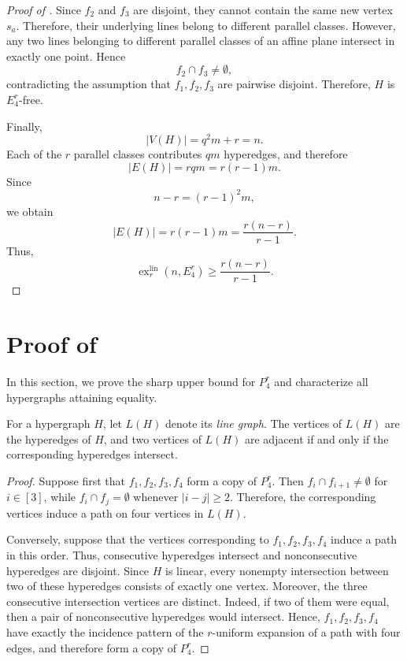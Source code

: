\documentclass[11pt,a4paper]{article}
\newtheorem{lemma}[theorem]{Lemma}
\theoremstyle{definition}
\theoremstyle{remark}
\begin{document}
\begin{proof}[Proof of ]
Since \(f_2\) and \(f_3\) are disjoint, they cannot contain the same
new vertex \(s_a\). Therefore, their underlying lines belong to
different parallel classes. However, any two lines belonging to
different parallel classes of an affine plane intersect in exactly
one point. Hence
$$
f_2\cap f_3\neq\emptyset,
$$
contradicting the assumption that \(f_1,f_2,f_3\) are pairwise
disjoint. Therefore, \(H\) is \(E_4^r\)-free.

Finally,
$$
|V(H)|
=
q^2m+r
=
n.
$$
Each of the \(r\) parallel classes contributes \(qm\) hyperedges, and
therefore
$$
|E(H)|
=
rqm
=
r(r-1)m.
$$
Since
$$
n-r=(r-1)^2m,
$$
we obtain
$$
|E(H)|
=
r(r-1)m
=
\frac{r(n-r)}{r-1}.
$$
Thus,
$$
\operatorname{ex}^{\mathrm{lin}}_r(n,E_4^r)
\geq
\frac{r(n-r)}{r-1}.
$$
\end{proof}

\section{Proof of }


In this section, we prove the sharp upper bound for $P_4^r$ and characterize all
hypergraphs attaining equality.


For a hypergraph $H$, let $L(H)$ denote its \emph{line graph}. The
vertices of $L(H)$ are the hyperedges of $H$, and two vertices of $L(H)$
are adjacent if and only if the corresponding hyperedges intersect.


\begin{proof}
Suppose first that $f_1,f_2,f_3,f_4$ form a copy of $P_4^r$. Then
$f_i\cap f_{i+1}\neq\emptyset$ for $i\in[3]$, while
$f_i\cap f_j=\emptyset$ whenever $|i-j|\geq 2$. Therefore, the
corresponding vertices induce a path on four vertices in $L(H)$.

Conversely, suppose that the vertices corresponding to
$f_1,f_2,f_3,f_4$ induce a path in this order. Thus, consecutive
hyperedges intersect and nonconsecutive hyperedges are disjoint. Since
$H$ is linear, every nonempty intersection between two of these
hyperedges consists of exactly one vertex. Moreover, the three
consecutive intersection vertices are distinct. Indeed, if two of them
were equal, then a pair of nonconsecutive hyperedges would intersect.
Hence, $f_1,f_2,f_3,f_4$ have exactly the incidence pattern of the
$r$-uniform expansion of a path with four edges, and therefore form a
copy of $P_4^r$.
\end{proof}
\end{document}
